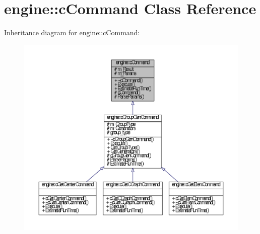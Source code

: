 \hypertarget{classengine_1_1cCommand}{\section{engine\-:\-:c\-Command \-Class \-Reference}
\label{classengine_1_1cCommand}
}


\-Inheritance diagram for engine\-:\-:c\-Command\-:
\nopagebreak
\begin{figure}[H]
\begin{center}
\leavevmode
\includegraphics[width=350pt]{classengine_1_1cCommand__inherit__graph}
\end{center}
\end{figure}


